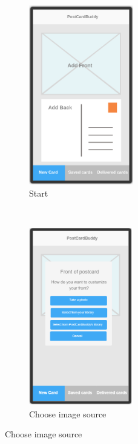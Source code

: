 \documentclass[10pt,a4paper]{article}
\begin{document}
\begin{figure}[p]
	\centering
	\begin{subfigure}{0.5\textwidth}
		\centering
		\includegraphics[width=0.5\textwidth]{Prototype_img/p5.png}
		\caption{Start}
		\label{fig:p1}
	\end{subfigure}~
	\begin{subfigure}{0.5\textwidth}
		\centering
		\includegraphics[width=0.5\textwidth]{Prototype_img/p2.png}
		\caption{Choose image source}

\end{subfigure}
\end{figure}
\end{document}
